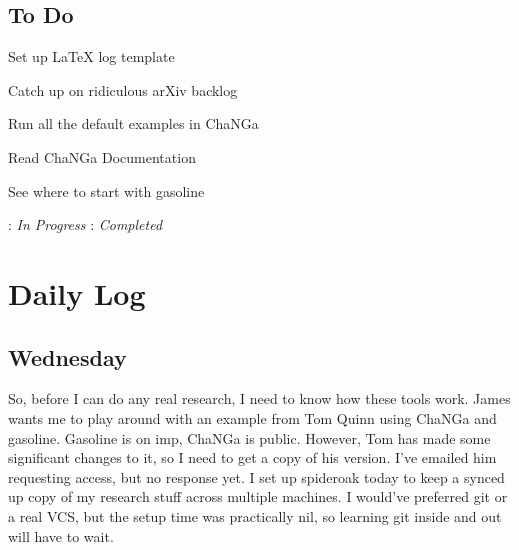 \documentclass[11pt,letterpaper]{article}
\begin{document}
\subsection*{To Do}
\begin{bullets}
\item[\checkmark] Set up LaTeX log template
\item[\textleaf] Catch up on ridiculous arXiv backlog
\item[\checkmark] Run all the default examples in ChaNGa
\item[\checkmark] Read ChaNGa Documentation
\item See where to start with gasoline
\end{bullets}

\textleaf : \textit{In Progress} \qquad \checkmark : \textit{Completed}

\section*{Daily Log}
\subsection*{Wednesday}
So, before I can do any real research, I need to know how these tools work.  
James wants me to play around with an example from Tom Quinn using ChaNGa and
gasoline.  Gasoline is on imp, ChaNGa is public.  However, Tom has made some 
significant changes to it, so I need to get a copy of his version.  I've emailed
him requesting access, but no response yet.  I set up spideroak today to keep
a synced up copy of my research stuff across multiple machines.  I would've 
preferred git or a real VCS, but the setup time was practically nil, so learning
git inside and out will have to wait.
\end{document}
